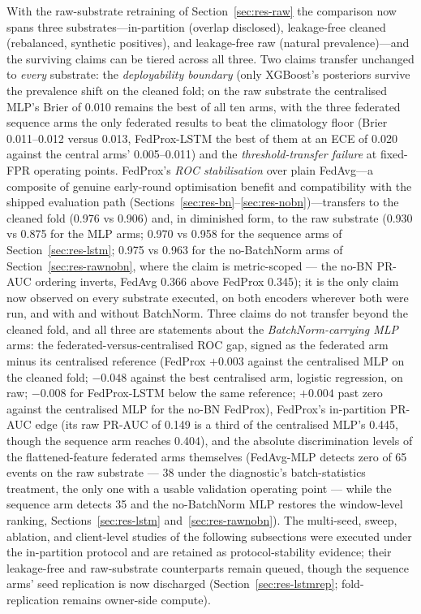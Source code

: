 With the raw-substrate retraining of Section~\ref{sec:res-raw} the
comparison now spans three substrates---in-partition (overlap
disclosed), leakage-free cleaned (rebalanced, synthetic positives),
and leakage-free raw (natural prevalence)---and the surviving claims
can be tiered across all three. Two claims transfer unchanged to
\emph{every} substrate: the \emph{deployability boundary} (only
XGBoost's posteriors survive the prevalence shift on the cleaned
fold; on the raw substrate the centralised MLP's Brier of 0.010
remains the best of all ten arms, with the three federated sequence
arms the only federated results to beat the climatology floor
(Brier 0.011--0.012 versus 0.013, FedProx-LSTM the best of them at
an ECE of 0.020 against the central arms'
0.005--0.011) and the \emph{threshold-transfer failure} at fixed-FPR
operating points. FedProx's \emph{ROC stabilisation} over plain FedAvg---a composite
of genuine early-round optimisation benefit and compatibility with the
shipped evaluation path (Sections~\ref{sec:res-bn}--\ref{sec:res-nobn})---transfers
to the cleaned fold (0.976 vs 0.906) and, in diminished form, to the
raw substrate (0.930 vs 0.875 for the MLP arms; 0.970 vs 0.958 for
the sequence arms of Section~\ref{sec:res-lstm}; 0.975 vs 0.963 for
the no-BatchNorm arms of Section~\ref{sec:res-rawnobn}, where the
claim is metric-scoped --- the no-BN PR-AUC ordering inverts, FedAvg
0.366 above FedProx 0.345); it is the only
claim now observed on every substrate executed, on both encoders
wherever both were run, and with and without BatchNorm. Three
claims do not transfer beyond the cleaned fold, and all three are
statements about the \emph{BatchNorm-carrying MLP} arms: the
federated-versus-centralised ROC gap, signed as the federated arm
minus its centralised reference (FedProx $+0.003$ against the
centralised MLP on the cleaned fold; $-0.048$ against the best
centralised arm, logistic regression, on raw; $-0.008$ for
FedProx-LSTM below the same reference; $+0.004$ past zero against
the centralised MLP for the no-BN FedProx),
FedProx's in-partition PR-AUC edge (its raw PR-AUC of 0.149 is a
third of the centralised MLP's 0.445, though the sequence arm
reaches 0.404), and the absolute discrimination levels of the
flattened-feature federated arms themselves (FedAvg-MLP detects zero
of 65 events on the raw substrate --- 38 under the diagnostic's
batch-statistics treatment, the only one with a usable validation
operating point --- while the sequence arm detects 35 and the
no-BatchNorm MLP restores the window-level ranking,
Sections~\ref{sec:res-lstm} and~\ref{sec:res-rawnobn}).
The multi-seed, sweep, ablation, and client-level
studies of the following subsections were executed under the
in-partition protocol and are retained as protocol-stability
evidence; their leakage-free and raw-substrate counterparts remain
queued, though the sequence arms' seed replication is now discharged
(Section~\ref{sec:res-lstmrep}; fold-replication remains owner-side
compute).

